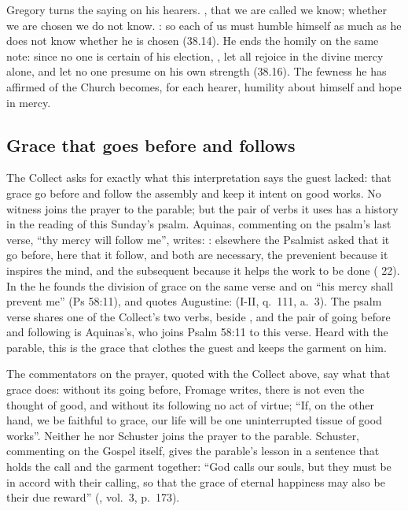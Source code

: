 Gregory turns the saying on his hearers. , that we are called we know; whether we are chosen we
do not know. : so each of us must humble himself
as much as he does not know whether he is chosen (38.14). He ends the homily on
the same note: since no one is certain of his election, , let all
rejoice in the divine mercy alone, and let no one presume on his own strength
(38.16). The fewness he has affirmed of the Church becomes, for each hearer,
humility about himself and hope in mercy.

\subsection{Grace that goes before and follows}

The Collect asks for exactly what this interpretation says the guest lacked:
that grace go before and follow the assembly and keep it intent on good works.
No witness joins the prayer to the parable; but the pair of verbs it uses has a
history in the reading of this Sunday's psalm. Aquinas, commenting on the
psalm's last verse, ``thy mercy will follow me'', writes: :
elsewhere the Psalmist asked that it go before, here that it follow, and both
are necessary, the prevenient because it inspires the mind, and the subsequent
because it helps the work to be done ( 22). In the
 he founds the division of grace on the same verse and on ``his mercy
shall prevent me'' (Ps 58:11), and quotes Augustine:  (I-II, q.~111, a.~3). The psalm verse
shares one of the Collect's two verbs,  beside
, and the pair of going before and following is Aquinas's, who
joins Psalm 58:11 to this verse. Heard with the parable, this is the grace
that clothes the guest and keeps the garment on him.

The commentators on the prayer, quoted with the Collect above, say what that
grace does: without its going before, Fromage writes, there is not even the
thought of good, and without its following no act of virtue; ``If, on the other
hand, we be faithful to grace, our life will be one uninterrupted tissue of
good works''. Neither he nor Schuster joins the prayer to the parable.
Schuster, commenting on the Gospel itself, gives the parable's lesson in a
sentence that holds the call and the garment together: ``God calls our souls,
but they must be in accord with their calling, so that the grace of eternal
happiness may also be their due reward'' (, vol.~3,
p.~173).

